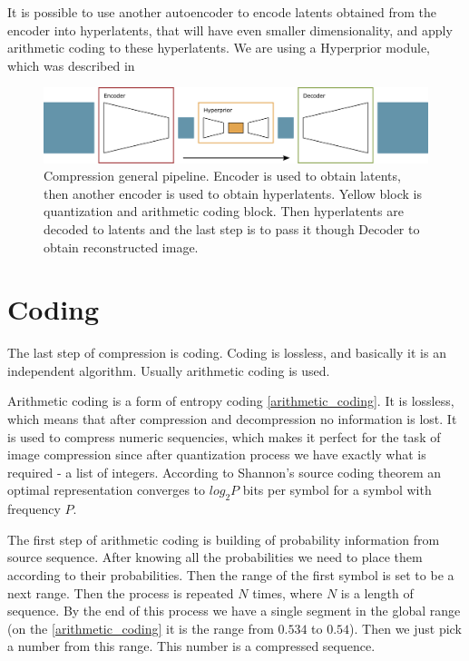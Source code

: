 It is possible to use another autoencoder to encode latents obtained from the encoder into hyperlatents, that will have even smaller dimensionality, and apply arithmetic coding to these hyperlatents. We are using a Hyperprior module, which was described in \cite{Ballé_Minnen_Singh_Hwang_Johnston_2018}

\begin{figure}[!ht]
    \centering
    \includegraphics[width=\textwidth]{figure/general.png}
    \caption{Compression general pipeline. Encoder is used to obtain latents, then another encoder is used to obtain hyperlatents. Yellow block is quantization and arithmetic coding block. Then hyperlatents are decoded to latents and the last step is to pass it though Decoder to obtain reconstructed image.}
    \label{whole-system-geneal-pipeline}
\end{figure}

\section{Coding}

The last step of compression is coding. Coding is lossless, and basically it is an independent algorithm. Usually arithmetic coding is used.

Arithmetic coding is a form of entropy coding \ref{arithmetic_coding}. It is lossless, which means that after compression and decompression no information is lost. It is used to compress numeric sequencies, which makes it perfect for the task of image compression since after quantization process we have exactly what is required - a list of integers. According to Shannon's source coding theorem an optimal representation converges to $log_2P$ bits per symbol for a symbol with frequency $P$.

The first step of arithmetic coding is building of probability information from source sequence. After knowing all the probabilities we need to place them according to their probabilities. Then the range of the first symbol is set to be a next range. Then the process is repeated $N$ times, where $N$ is a length of sequence. By the end of this process we have a single segment in the global range (on the \ref{arithmetic_coding} it is the range from $0.534$ to $0.54$). Then we just pick a number from this range. This number is a compressed sequence.


